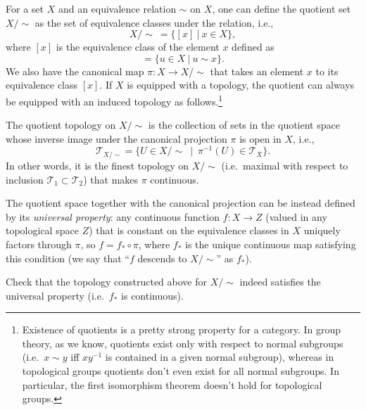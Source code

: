 \documentclass[english,letterpaper]{article}%
\numberwithin{equation}{section}
\numberwithin{figure}{section}
\numberwithin{table}{section}
\theoremstyle{definition}
\theoremstyle{definition}
\theoremstyle{definition}
\theoremstyle{plain}
\theoremstyle{plain}
\theoremstyle{plain}
\theoremstyle{plain}
\theoremstyle{remark}
\theoremstyle{remark}
\begin{document}
For a set $X$ and an equivalence relation $\sim$ on $X$, one can define the quotient set $X/\sim$ as the set of equivalence classes under the relation, i.e.,
\begin{equation}
    X/\sim ~ = \{ [x] ~|~ x\in X \},
\end{equation}
where $[x]$ is the equivalence class of the element $x$ defined as
\begin{equation}
    [x] = \{u\in X ~|~ u \sim x\}.
\end{equation}
We also have the canonical map $\pi:X\rightarrow X/\sim$ that takes an element $x$ to its equivalence class $[x]$. If $X$ is equipped with a topology, the quotient can always be equipped with an induced topology as follows.\footnote{Existence of quotients is a pretty strong property for a category. In group theory, as we know, quotients exist only with respect to normal subgroups (i.e.\ $x\sim y$ iff $xy^{-1}$ is contained in a given normal subgroup), whereas in topological groups quotients don't even exist for all normal subgroups. In particular, the first isomorphism theorem doesn't hold for topological groups.}


\begin{defn}
The quotient topology on $X/\sim$ is the collection of sets  in the quotient space whose inverse image under the canonical projection $\pi$ is open in $X$, i.e.,
\begin{equation}
    \mathcal{T}_{X/\sim} = \{U\in X/\sim ~ \mid ~ \pi^{-1}(U) \in \mathcal{T}_X\}.
\end{equation}
In other words, it is the finest topology on $X/\sim$ (i.e.\ maximal with respect to inclusion $\mathcal{T}_1\subset \mathcal{T}_2$) that makes $\pi$ continuous.
\end{defn}

The quotient space together with the canonical projection can be instead defined by its \emph{universal property}: any continuous function $f:X\to Z$ (valued in any topological space $Z$) that is constant on the equivalence classes in $X$ uniquely factors through  $\pi$, so $f=f_\ast\circ\pi$, where $f_\ast$ is the unique continuous map satisfying this condition (we say that ``$f$ descends to $X/\sim$'' as $f_\ast$).
\begin{xca}
Check that the topology constructed above for $X/\sim$ indeed satisfies the universal property (i.e.\ $f_\ast$ is continuous).
\end{xca}
\end{document}
